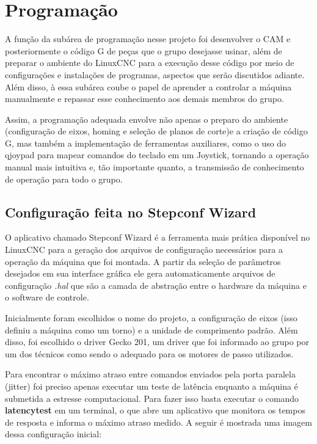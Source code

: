 \chapter{Programação}

A função da subárea de programação nesse projeto foi desenvolver o CAM e posteriormente o código G de peças que o grupo desejasse usinar, além de preparar o ambiente do LinuxCNC para a execução desse código por meio de configurações e instalações de programas, aspectos que serão discutidos adiante. Além disso, à essa subárea coube o papel de aprender a controlar a máquina manualmente e repassar esse conhecimento aos demais membros do grupo. 

Assim, a programação adequada envolve não apenas o preparo do ambiente (configuração de eixos, homing e seleção de planos de corte)e a criação de código G, mas também a implementação de ferramentas auxiliares, como o uso do qjoypad para mapear comandos do teclado em um Joystick, tornando a operação manual mais intuitiva e, tão importante quanto, a transmissão de conhecimento de operação para todo o grupo.

\section{Configuração feita no Stepconf Wizard}

O aplicativo chamado Stepconf Wizard é a ferramenta mais prática disponível no LinuxCNC para a geração dos arquivos de configuração necessários para a operação da máquina que foi montada. A partir da seleção de parâmetros desejados em sua interface gráfica ele gera automaticamente arquivos de configuração \textit{.hal} que são a camada de abstração entre o hardware da máquina e o software de controle. 

Inicialmente foram escolhidos o nome do projeto, a configuração de eixos (isso definiu a máquina como um torno) e a unidade de comprimento padrão. Além disso, foi escolhido o driver Gecko 201, um driver que foi informado ao grupo por um dos técnicos como sendo o adequado para os motores de passo utilizados.

Para encontrar o máximo atraso entre comandos enviados pela porta paralela (jitter) foi preciso apenas executar um teste de latência enquanto a máquina é submetida a estresse computacional. Para fazer isso basta executar o comando \textbf{latencytest} em um terminal, o que abre um aplicativo que monitora os tempos de resposta e informa o máximo atraso medido. A seguir é mostrada uma imagem dessa configuração inicial:

